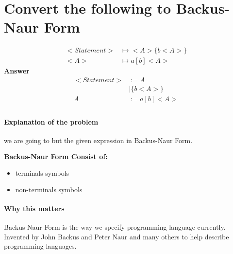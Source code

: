 \section{Convert the following to Backus-Naur Form}
\begin{align*}
<Statement> &\mapsto <A> \{b<A>\} \\
<A> &\mapsto a [b] <A>
\end{align*}
\textbf{Answer}
\begin{align*}
<Statement> &:= A \\ 
	    &| \{b<A>\} \\
A &:= a [b] <A>\\
\end{align*}
\paragraph{Explanation of the problem} we are going to but the given expression in Backus-Naur Form. 

\textbf{Backus-Naur Form Consist of:}
\begin{itemize}
	\item terminals symbols  
	\item non-terminals symbols
\end{itemize}

\paragraph{Why this matters} Backus-Naur Form is the way we specify programming language currently. Invented by John Backus and Peter Naur and many others to help describe programming languages. 

